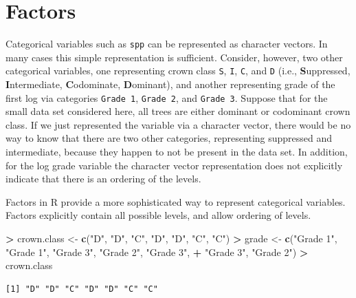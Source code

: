 \documentclass[]{krantz}
\makeatletter
\newenvironment{Shaded}{\begin{snugshade}}{\end{snugshade}}
\newcommand{\KeywordTok}[1]{\textcolor[rgb]{0.27,0.27,0.27}{\textbf{#1}}}
\newcommand{\StringTok}[1]{\textcolor[rgb]{0.5,0.5,0.5}{#1}}
\newcommand{\OperatorTok}[1]{\textcolor[rgb]{0.43,0.43,0.43}{\textbf{#1}}}
\newcommand{\NormalTok}[1]{#1}
\newenvironment{kframe}{%
\medskip{}
\setlength{\fboxsep}{.8em}
 \def\at@end@of@kframe{}%
 \ifinner\ifhmode%
  \def\at@end@of@kframe{\end{minipage}}%
  \begin{minipage}{\columnwidth}%
 \fi\fi%
 \def\FrameCommand##1{\hskip\@totalleftmargin \hskip-\fboxsep
 \colorbox{shadecolor}{##1}\hskip-\fboxsep
     \hskip-\linewidth \hskip-\@totalleftmargin \hskip\columnwidth}%
 \MakeFramed {\advance\hsize-\width
   \@totalleftmargin\z@ \linewidth\hsize
   \@setminipage}}%
 {\par\unskip\endMakeFramed%
 \at@end@of@kframe}
\renewenvironment{Shaded}{\begin{kframe}}{\end{kframe}}
\theoremstyle{definition}
\theoremstyle{definition}
\theoremstyle{definition}
\theoremstyle{remark}
\makeatother
\begin{document}
\section{Factors}\label{factors}

Categorical variables such as \texttt{spp} can be represented as
character vectors. In many cases this simple representation is
sufficient. Consider, however, two other categorical variables, one
representing crown class \texttt{S}, \texttt{I}, \texttt{C}, and
\texttt{D} (i.e., \textbf{S}uppressed, \textbf{I}ntermediate,
\textbf{C}odominate, \textbf{D}ominant), and another representing grade
of the first log via categories \texttt{Grade\ 1}, \texttt{Grade\ 2},
and \texttt{Grade\ 3}. Suppose that for the small data set considered
here, all trees are either dominant or codominant crown class. If we
just represented the variable via a character vector, there would be no
way to know that there are two other categories, representing suppressed
and intermediate, because they happen to not be present in the data set.
In addition, for the log grade variable the character vector
representation does not explicitly indicate that there is an ordering of
the levels.

Factors in R provide a more sophisticated way to represent categorical
variables. Factors explicitly contain all possible levels, and allow
ordering of levels.

\begin{Shaded}
\begin{Highlighting}[]
\OperatorTok{>}\StringTok{ }\NormalTok{crown.class <-}\StringTok{ }\KeywordTok{c}\NormalTok{(}\StringTok{"D"}\NormalTok{, }\StringTok{"D"}\NormalTok{, }\StringTok{"C"}\NormalTok{, }\StringTok{"D"}\NormalTok{, }\StringTok{"D"}\NormalTok{, }\StringTok{"C"}\NormalTok{, }\StringTok{"C"}\NormalTok{)}
\OperatorTok{>}\StringTok{ }\NormalTok{grade <-}\StringTok{ }\KeywordTok{c}\NormalTok{(}\StringTok{"Grade 1"}\NormalTok{, }\StringTok{"Grade 1"}\NormalTok{, }\StringTok{"Grade 3"}\NormalTok{, }\StringTok{"Grade 2"}\NormalTok{, }\StringTok{"Grade 3"}\NormalTok{, }
\OperatorTok{+}\StringTok{   "Grade 3"}\NormalTok{, }\StringTok{"Grade 2"}\NormalTok{)}
\OperatorTok{>}\StringTok{ }\NormalTok{crown.class}
\end{Highlighting}
\end{Shaded}

\begin{verbatim}
[1] "D" "D" "C" "D" "D" "C" "C"
\end{verbatim}
\end{document}
